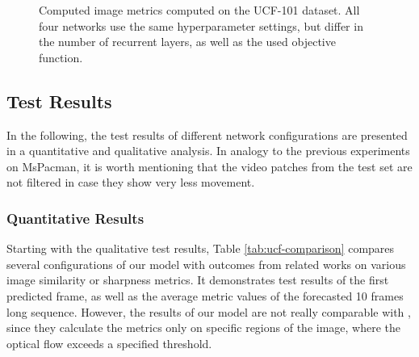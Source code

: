 \begin{figure}[htb]
\begin{subfigure}{0.5\textwidth}
{
  }
  \caption{}
  \label{fig:plot-ucf-loss-ssim}
\end{subfigure}
\caption[Comparison of Image Metrics on UCF-101]{Computed image metrics computed on the UCF-101 dataset. All four networks use the same hyperparameter settings, but differ in the number of recurrent layers, as well as the used objective function.} \label{fig:plot-ucf-imgmetric}
\end{figure}





\subsection{Test Results}

In the following, the test results of different network configurations are presented in a quantitative and qualitative analysis. In analogy to the previous experiments on MsPacman, it is worth mentioning that the video patches from the test set are not filtered in case they show very less movement.

\subsubsection{Quantitative Results}

Starting with the qualitative test results, Table \ref{tab:ucf-comparison} compares several configurations of our model with outcomes from related works on various image similarity or sharpness metrics. It demonstrates test results of the first predicted frame, as well as the average metric values of the forecasted 10 frames long sequence. However, the results of our model are not really comparable with \parencite{deep_multiscale_video_pred}, since they calculate the metrics only on specific regions of the image, where the optical flow exceeds a specified threshold.

